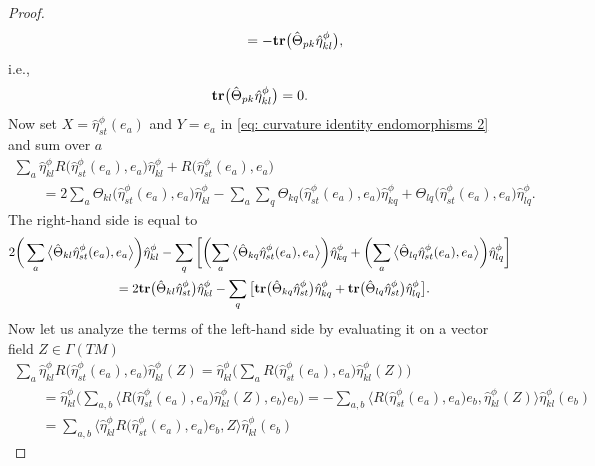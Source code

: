 \documentclass[pdftex]{sigma}
\newcommand{\tr}{\mbox{\bf tr}}
\numberwithin{equation}{section}
\begin{document}
\begin{proof}
\begin{gather*}
\hphantom{\tr\big(\hat\Theta_{pk}\hat\eta_{kl}^\phi\big)}{}=
 -\tr\big(\hat\Theta_{pk}\hat\eta_{kl}^\phi\big) ,
\end{gather*}
i.e.,
\begin{gather}
\tr\big(\hat\Theta_{pk}\hat\eta_{kl}^\phi\big) =0.\label{eq: vanishing traces 4}
\end{gather}
Now set $X=\hat\eta_{st}^\phi (e_a)$ and $Y=e_a$ in \eqref{eq: curvature identity endomorphisms 2} and sum over $a$
\begin{gather*}
\sum_a\hat{\eta}^\phi_{kl}{R\big(\hat\eta_{st}^\phi(e_a),e_a\big)}\hat{\eta}^\phi_{kl}+{R\big(\hat\eta_{st}^\phi(e_a),e_a\big)}\\
\qquad{} = 2\sum_a\Theta_{kl}\big(\hat\eta_{st}^\phi(e_a),e_a\big)\hat\eta_{kl}^\phi
 -\sum_a\sum_{q} \Theta_{kq}\big(\hat\eta_{st}^\phi(e_a),e_a\big) \hat{\eta}^\phi_{kq}+ \Theta_{lq}\big(\hat\eta_{st}^\phi(e_a),e_a\big)\hat{\eta}^\phi_{lq}.
\end{gather*}
The right-hand side is equal to
\begin{gather*}
 2\bigg(\sum_a\big\langle \hat\Theta_{kl}\hat\eta_{st}^\phi(e_a),e_a\big\rangle \bigg)\hat\eta_{kl}^\phi
 -\sum_{q} \bigg[\bigg(\!\sum_a\big\langle \hat\Theta_{kq}\hat\eta_{st}^\phi(e_a),e_a\big\rangle \bigg) \hat{\eta}^\phi_{kq}
 + \bigg(\!\sum_a\big\langle \hat\Theta_{lq}\hat\eta_{st}^\phi(e_a),e_a\big\rangle \bigg)\hat{\eta}^\phi_{lq}\bigg] \\
\qquad{} = 2\tr\big(\hat\Theta_{kl}\hat\eta_{st}^\phi\big)\hat\eta_{kl}^\phi
 -\sum_{q} \big[\tr\big(\hat\Theta_{kq}\hat\eta_{st}^\phi\big) \hat{\eta}^\phi_{kq}
 + \tr\big(\hat\Theta_{lq}\hat\eta_{st}^\phi\big)\hat{\eta}^\phi_{lq}\big] .
\end{gather*}
Now let us analyze the terms of the left-hand side by evaluating it on a vector field $Z\in\Gamma(TM)$
\begin{gather*}
\sum_a\hat{\eta}^\phi_{kl}{R\big(\hat\eta_{st}^\phi(e_a),e_a\big)}\hat{\eta}^\phi_{kl} (Z)
 =\hat{\eta}^\phi_{kl}\bigg(\sum_a{R\big(\hat\eta_{st}^\phi(e_a),e_a\big)}\hat{\eta}^\phi_{kl}(Z)\bigg)\\
 \qquad {} =\hat{\eta}^\phi_{kl}\bigg(\sum_{a,b}\big\langle {R\big(\hat\eta_{st}^\phi(e_a),e_a\big)}\hat{\eta}^\phi_{kl}(Z),e_b\big\rangle e_b\bigg)
 = -\sum_{a,b}\big\langle {R\big(\hat\eta_{st}^\phi(e_a),e_a\big)}e_b,\hat{\eta}^\phi_{kl}(Z)\big\rangle \hat{\eta}^\phi_{kl}(e_b)\\
 \qquad {}= \sum_{a,b}\big\langle \hat{\eta}^\phi_{kl}{R\big(\hat\eta_{st}^\phi(e_a),e_a\big)}e_b,Z\big\rangle \hat{\eta}^\phi_{kl}(e_b)

\end{gather*}
\end{proof}
\end{document}
